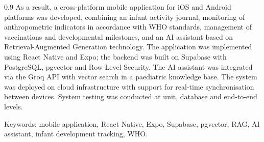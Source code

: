 \begin{spacing}{0.9}
As a result, a cross-platform mobile application for iOS and Android platforms was developed, combining an infant activity journal, monitoring of anthropometric indicators in accordance with WHO standards, management of vaccinations and developmental milestones, and an AI assistant based on Retrieval-Augmented Generation technology. The application was implemented using React Native and Expo; the backend was built on Supabase with PostgreSQL, pgvector and Row-Level Security. The AI assistant was integrated via the Groq API with vector search in a paediatric knowledge base. The system was deployed on cloud infrastructure with support for real-time synchronisation between devices. System testing was conducted at unit, database and end-to-end levels.

Keywords: mobile application, React Native, Expo, Supabase, pgvector, RAG, AI assistant, infant development tracking, WHO.

\end{spacing}
